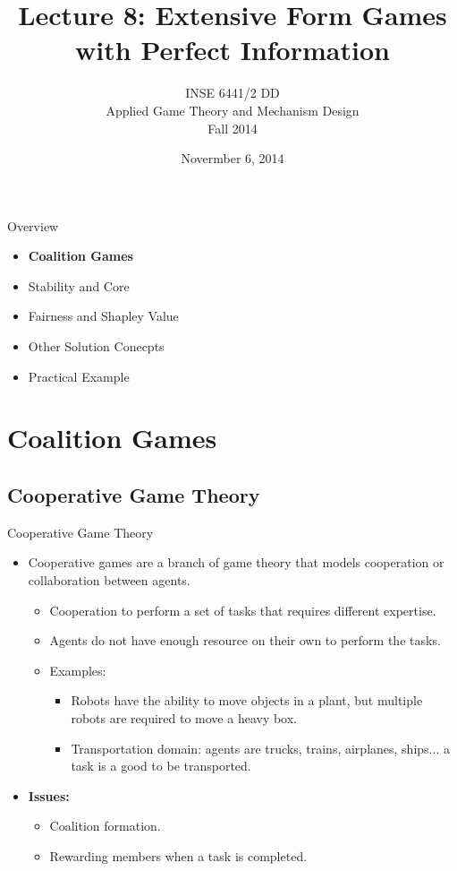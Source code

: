 \documentclass{beamer}
\title[Lecture 8: Extensive Form Games with Perfect Information]{Lecture 8: Extensive Form Games with Perfect Information}
\author{INSE 6441/2 DD\\ \vspace{0.2cm} Applied Game Theory and Mechanism Design \\ Fall 2014}
\institute{Department of Computer Science and Software Engineering\\Concordia University}
\date{Novermber 6, 2014}
\begin{document}
\begin{frame}
\titlepage
\end{frame}

\begin{frame}{Overview}
    \begin{itemize}
     	\itemsep=.5cm
    	\item {\bf Coalition Games}
    	\item Stability and Core
    	\item Fairness and Shapley Value
    	\item Other Solution Conecpts
        \item Practical Example
    \end{itemize}
\end{frame}


\section{Coalition Games}
\subsection{Cooperative Game Theory}

\begin{frame}{Cooperative Game Theory}
  \begin{itemize}
     \item Cooperative games are a branch of game theory that models cooperation or collaboration between agents.
     \begin{itemize}
        \item Cooperation to perform a set of tasks that requires different expertise.
        \item Agents do not have enough resource on their own to perform the tasks.
        \item Examples:
        \begin{itemize}
            \item Robots have the ability to move objects in a plant, but multiple robots are required to move a heavy box.
            \item Transportation domain: agents are trucks, trains, airplanes, ships... a task is a good to be transported.
        \end{itemize}
    \end{itemize}
    \item \textbf{Issues:}
        \begin{itemize}
            \item Coalition formation.
            \item Rewarding members when a task is completed.
        \end{itemize}
  \end{itemize}
\end{frame}
\end{document}
